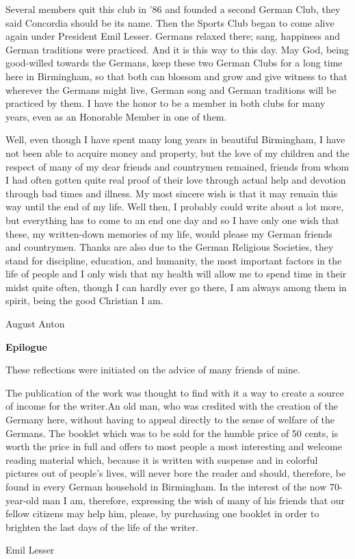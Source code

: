 \documentclass{article}
\begin{document}
Several members quit this club in '86 and founded a second German Club, they said Concordia should be its name. Then the Sports Club began to come alive again under President Emil Lesser. Germans relaxed there; sang, happiness and German traditions were practiced. And it is this way to this day. May God, being good-willed towards the Germans, keep these two German Clubs for a long time here in Birmingham, so that both can blossom and grow and give witness to that wherever the Germans might live, German song and German traditions will be practiced by them. I have the honor to be a member in both clubs for many years, even as an Honorable Member in one of them.

Well, even though I have spent many long years in beautiful Birmingham, I have not been able to acquire money and property, but the love of my children and the respect of many of my dear friends and countrymen remained, friends from whom I had often gotten quite real proof of their love through actual help and devotion through bad times and illness. My most sincere wish is that it may remain this way until the end of my life. Well then, I probably could write about a lot more, but everything has to come to an end one day and so I have only one wish that these, my written-down memories of my life, would please my German friends and countrymen. Thanks are also due to the German Religious Societies, they stand for discipline, education, and humanity, the most important factors in the life of people and I only wish that my health will allow me to spend time in their midst quite often, though I can hardly ever go there, I am always among them in spirit, being the good Christian I am.

August Anton

\textbf{Epilogue}

These reflections were initiated on the advice of many friends of mine.

The publication of the work was thought to find with it a way to create a source of income for the writer.An old man, who was credited with the creation of the Germany here, without having to appeal directly to the sense of welfare of the Germans. The booklet which was to be sold for the humble price of 50 cents, is worth the price in full and offers to most people a most interesting and welcome reading material which, because it is written with suspense and in colorful pictures out of people's lives, will never bore the reader and should, therefore, be found in every German household in Birmingham. In the interest of the now 70-year-old man I am, therefore, expressing the wish of many of his friends that our fellow citizens may help him, please, by purchasing one booklet in order to brighten the last days of the life of the writer.

Emil Lesser
\end{document}
